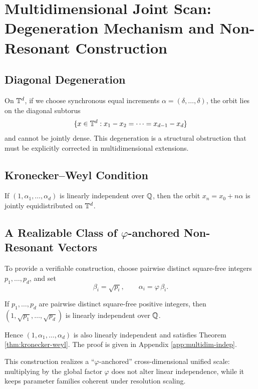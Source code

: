 ﻿\section{Multidimensional Joint Scan: Degeneration Mechanism and Non-Resonant Construction}

\subsection{Diagonal Degeneration}

On $\mathbb{T}^d$, if we choose synchronous equal increments $\alpha=(\delta,\dots,\delta)$, the orbit lies on the diagonal subtorus
\[
\{x\in\mathbb{T}^d: x_1-x_2=\cdots=x_{d-1}-x_d\}
\]
and cannot be jointly dense. This degeneration is a structural obstruction that must be explicitly corrected in multidimensional extensions.

\subsection{Kronecker--Weyl Condition}

\begin{theorem}\label{thm:kronecker-weyl}
If $(1,\alpha_1,\dots,\alpha_d)$ is linearly independent over $\mathbb{Q}$, then the orbit $x_n=x_0+n\alpha$ is jointly equidistributed on $\mathbb{T}^d$.
\end{theorem}

\subsection{A Realizable Class of \texorpdfstring{$\varphi$}{varphi}-anchored Non-Resonant Vectors}

To provide a verifiable construction, choose pairwise distinct square-free integers $p_1,\dots,p_d$, and set
\[
\beta_i=\sqrt{p_i},\qquad \alpha_i=\varphi\,\beta_i.
\]

\begin{lemma}\label{lem:sqrt-independence}
If $p_1,\dots,p_d$ are pairwise distinct square-free positive integers, then $(1,\sqrt{p_1},\dots,\sqrt{p_d})$ is linearly independent over $\mathbb{Q}$.
\end{lemma}
Hence $(1,\alpha_1,\dots,\alpha_d)$ is also linearly independent and satisfies Theorem \ref{thm:kronecker-weyl}. The proof is given in Appendix \ref{app:multidim-indep}.

This construction realizes a ``$\varphi$-anchored'' cross-dimensional unified scale: multiplying by the global factor $\varphi$ does not alter linear independence, while it keeps parameter families coherent under resolution scaling.
